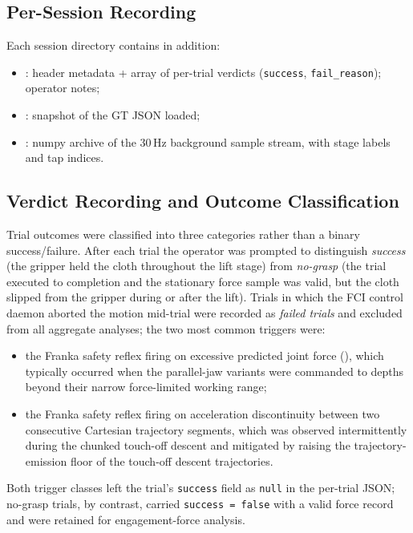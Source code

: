 \subsection{Per-Session Recording}

Each session directory  contains in addition:
\begin{itemize}
  \item {}: header metadata + array of per-trial
        verdicts (\texttt{success}, \texttt{fail\_reason}); operator notes;
  \item {}: snapshot of the GT JSON loaded;
  \item {}: numpy archive of the 30\,Hz background
        sample stream, with stage labels and tap indices.
\end{itemize}

\subsection{Verdict Recording and Outcome Classification}
\label{sec:verdict-recording}

Trial outcomes were classified into three categories rather than a binary
success/failure. After each trial the operator was prompted to distinguish
\emph{success} (the gripper held the cloth throughout the lift stage) from
\emph{no-grasp} (the trial executed to completion and the stationary
force sample was valid, but the cloth slipped from the gripper during
or after the lift). Trials in which the FCI control daemon aborted the
motion mid-trial were recorded as \emph{failed trials} and excluded
from all aggregate analyses; the two most common triggers were:
\begin{itemize}
  \item the Franka safety reflex firing on excessive predicted joint
        force (), which typically
        occurred when the parallel-jaw variants were commanded to
        depths beyond their narrow force-limited working range;
  \item the Franka safety reflex firing on acceleration discontinuity
        between two consecutive Cartesian trajectory segments, which
        was observed intermittently during the chunked touch-off
        descent and mitigated by raising the trajectory-emission floor of the
        touch-off descent trajectories.
\end{itemize}
Both trigger classes left the trial's \texttt{success} field as
\texttt{null} in the per-trial JSON; no-grasp trials, by contrast,
carried \texttt{success = false} with a valid force record and were
retained for engagement-force analysis.

